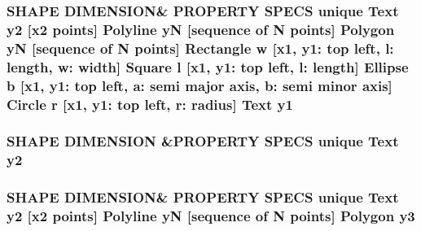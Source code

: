 \subsubsection[{\texorpdfstring{y1}{y1}}]{\setlength{\rightskip}{0pt plus 5cm}S\+H\+A\+PE D\+I\+M\+E\+N\+S\+I\+ON\& P\+R\+O\+P\+E\+R\+TY S\+P\+E\+CS unique {\bf Text} {\bf y2} \mbox{[}{\bf x2} points\mbox{]} {\bf Polyline} yN \mbox{[}sequence of N points\mbox{]} {\bf Polygon} yN \mbox{[}sequence of N points\mbox{]} {\bf Rectangle} w \mbox{[}{\bf x1}, y1\+: top left, l\+: length, w\+: width\mbox{]} {\bf Square} {\bf l} \mbox{[}{\bf x1}, y1\+: top left, l\+: length\mbox{]} {\bf Ellipse} b \mbox{[}{\bf x1}, y1\+: top left, a\+: semi major axis, b\+: semi minor axis\mbox{]} {\bf Circle} r \mbox{[}{\bf x1}, y1\+: top left, r\+: radius\mbox{]} {\bf Text} y1}\hypertarget{shape__input__file__specs_8txt_ae6da77b2f90c75c4b96658c20d0f9938}{}\label{shape__input__file__specs_8txt_ae6da77b2f90c75c4b96658c20d0f9938}
\subsubsection[{\texorpdfstring{y2}{y2}}]{\setlength{\rightskip}{0pt plus 5cm}S\+H\+A\+PE D\+I\+M\+E\+N\+S\+I\+ON \&P\+R\+O\+P\+E\+R\+TY S\+P\+E\+CS unique {\bf Text} y2}\hypertarget{shape__input__file__specs_8txt_a87b0346d2b040fbc73601f3fd8171852}{}\label{shape__input__file__specs_8txt_a87b0346d2b040fbc73601f3fd8171852}
\subsubsection[{\texorpdfstring{y3}{y3}}]{\setlength{\rightskip}{0pt plus 5cm}S\+H\+A\+PE D\+I\+M\+E\+N\+S\+I\+ON\& P\+R\+O\+P\+E\+R\+TY S\+P\+E\+CS unique {\bf Text} {\bf y2} \mbox{[}{\bf x2} points\mbox{]} {\bf Polyline} yN \mbox{[}sequence of N points\mbox{]} {\bf Polygon} y3}\hypertarget{shape__input__file__specs_8txt_a0f1cc68600a86252d2497b6b561b3c25}{}\label{shape__input__file__specs_8txt_a0f1cc68600a86252d2497b6b561b3c25}

